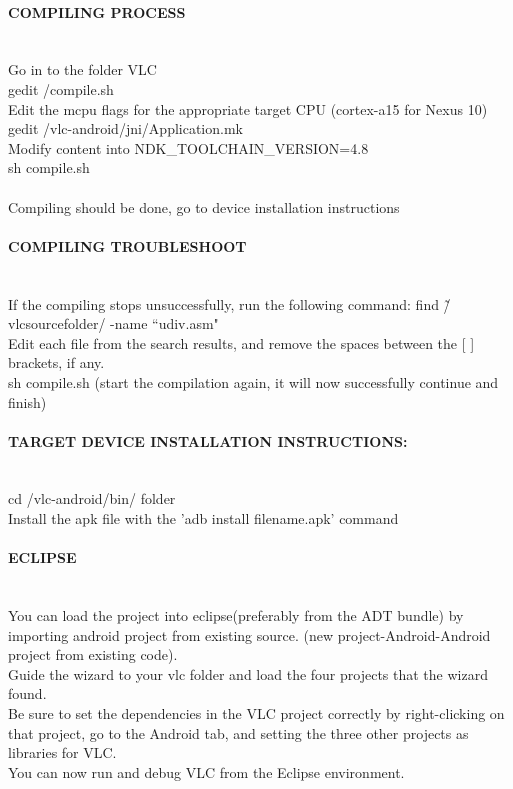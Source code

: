 \paragraph{COMPILING PROCESS}\mbox{}\\
Go in to the folder VLC\\
gedit /compile.sh\\
Edit the mcpu flags for the appropriate target CPU (cortex-a15 for Nexus 10)\\
gedit /vlc-android/jni/Application.mk\\
Modify content into NDK\_TOOLCHAIN\_VERSION=4.8\\
sh compile.sh\\
\\
Compiling should be done, go to device installation instructions\\

\paragraph{COMPILING TROUBLESHOOT}\mbox{}\\
If the compiling stops unsuccessfully, run the following command: find \~/vlcsourcefolder/ -name ``udiv.asm"\\
Edit each file from the search results, and remove the spaces between the [ ] brackets, if any.\\
sh compile.sh (start the compilation again, it will now successfully continue and finish)\\

\paragraph{TARGET DEVICE INSTALLATION INSTRUCTIONS:}\mbox{}\\
cd /vlc-android/bin/ folder\\
Install the apk file with the 'adb install filename.apk' command\\

\paragraph{ECLIPSE}\mbox{}\\
You can load the project into eclipse(preferably from the ADT bundle) by importing android project from existing source. (new project-Android-Android project from existing code).\\
Guide the wizard to your vlc folder and load the four projects that the wizard found.\\
Be sure to set the dependencies in the VLC project correctly by right-clicking on that project, go to the Android tab, and setting the three other projects as libraries for VLC.\\
You can now run and debug VLC from the Eclipse environment.\\
